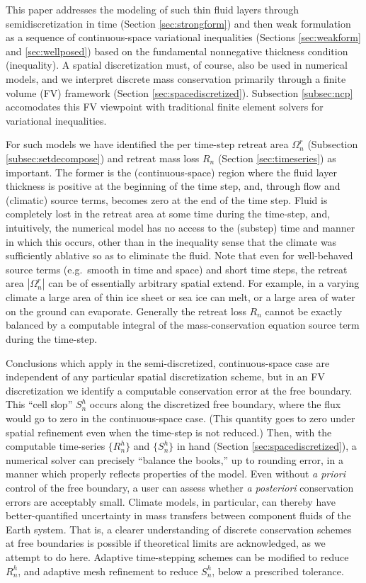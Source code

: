 \documentclass[final,onefignum]{siamart190516}
\begin{document}
This paper addresses the modeling of such thin fluid layers through semidiscretization in time (Section \ref{sec:strongform}) and then weak formulation as a sequence of continuous-space variational inequalities (Sections \ref{sec:weakform} and \ref{sec:wellposed}) based on the fundamental nonnegative thickness condition (inequality).  A spatial discretization must, of course, also be used in numerical models, and we interpret discrete mass conservation primarily through a finite volume (FV) framework (Section \ref{sec:spacediscretized}).  Subsection \ref{subsec:ncp} accomodates this FV viewpoint with traditional finite element solvers for variational inequalities.

For such models we have identified the per time-step retreat area $\Omega_n^r$ (Subsection \ref{subsec:setdecompose}) and retreat mass loss $R_n$ (Section \ref{sec:timeseries}) as important.  The former is the (continuous-space) region where the fluid layer thickness is positive at the beginning of the time step, and, through flow and (climatic) source terms, becomes zero at the end of the time step.  Fluid is completely lost in the retreat area at some time during the time-step, and, intuitively, the numerical model has no access to the (substep) time and manner in which this occurs, other than in the inequality sense that the climate was sufficiently ablative so as to eliminate the fluid.  Note that even for well-behaved source terms (e.g.~smooth in time and space) and short time steps, the retreat area $|\Omega_n^r|$ can be of essentially arbitrary spatial extend.  For example, in a varying climate a large area of thin ice sheet or sea ice can melt, or a large area of water on the ground can evaporate.  Generally the retreat loss $R_n$ cannot be exactly balanced by a computable integral of the mass-conservation equation source term during the time-step.

Conclusions which apply in the semi-discretized, continuous-space case are independent of any particular spatial discretization scheme, but in an FV discretization we identify a computable conservation error at the free boundary.  This ``cell slop'' $S_n^h$ occurs along the discretized free boundary, where the flux would go to zero in the continuous-space case.  (This quantity goes to zero under spatial refinement even when the time-step is not reduced.)  Then, with the computable time-series $\{R_n^h\}$ and $\{S_n^h\}$ in hand (Section \ref{sec:spacediscretized}), a numerical solver can precisely ``balance the books,'' up to rounding error, in a manner which properly reflects properties of the model.  Even without \emph{a priori} control of the free boundary, a user can assess whether \emph{a posteriori} conservation errors are acceptably small.  Climate models, in particular, can thereby have better-quantified uncertainty in mass transfers between component fluids of the Earth system.  That is, a clearer understanding of discrete conservation schemes at free boundaries is possible if theoretical limits are acknowledged, as we attempt to do here.  Adaptive time-stepping schemes can be modified to reduce $R_n^h$, and adaptive mesh refinement to reduce $S_n^h$, below a prescribed tolerance.
\end{document}

